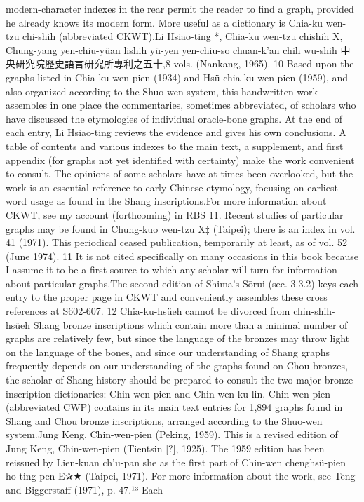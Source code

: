 modern-character indexes in the rear permit the reader to find a graph, provided he
already knows its modern form.
More useful as a dictionary is Chia-ku wen-tzu chi-shih (abbreviated CKWT).Li Hsiao-ting *, Chia-ku wen-tzu chishih X, Chung-yang yen-chiu-yüan lishih yü-yen yen-chiu-so chuan-k'an chih wu-shih 中央研究院歷史語言研究所專利之五十,8 vols. (Nankang, 1965). 10 Based
upon the graphs listed in Chia-ku wen-pien (1934) and Hsü chia-ku wen-pien (1959), and also
organized according to the Shuo-wen system, this handwritten work assembles in one place
the commentaries, sometimes abbreviated, of scholars who have discussed the etymologies
of individual oracle-bone graphs. At the end of each entry, Li Hsiao-ting reviews the
evidence and gives his own conclusions. A table of contents and various indexes to the
main text, a supplement, and first appendix (for graphs not yet identified with certainty)
make the work convenient to consult. The opinions of some scholars have at times been
overlooked, but the work is an essential reference to early Chinese etymology, focusing
on earliest word usage as found in the Shang inscriptions.For more information about CKWT, see my account (forthcoming) in RBS 11. Recent studies of particular graphs may be found in Chung-kuo wen-tzu X‡ (Taipei); there is an index in vol. 41 (1971). This periodical ceased publication, temporarily at least, as of vol. 52 (June 1974). 11 It is not cited specifically on
many occasions in this book because I assume it to be a first source to which any scholar
will turn for information about particular graphs.The second edition of Shima's Sōrui (sec. 3.3.2) keys each entry to the proper page in CKWT and conveniently assembles these cross references at S602-607. 12
Chia-ku-hsüeh cannot be divorced from chin-shih-hsüeh
Shang bronze
inscriptions which contain more than a minimal number of graphs are relatively few,
but since the language of the bronzes may throw light on the language of the bones, and
since our understanding of Shang graphs frequently depends on our understanding of
the graphs found on Chou bronzes, the scholar of Shang history should be prepared to
consult the two major bronze inscription dictionaries: Chin-wen-pien and Chin-wen ku-lin.
Chin-wen-pien (abbreviated CWP) contains in its main text entries for 1,894 graphs found in
Shang and Chou bronze inscriptions, arranged according to the Shuo-wen system.Jung Keng, Chin-wen-pien (Peking, 1959). This is a revised edition of Jung Keng, Chin-wen-pien (Tientsin [?], 1925). The 1959 edition has been reissued by Lien-kuan ch'u-pan she as the first part of Chin-wen chenghsü-pien ho-ting-pen E✰★ (Taipei, 1971). For more information about the work, see Teng and Biggerstaff (1971), p. 47.¹³ Each
